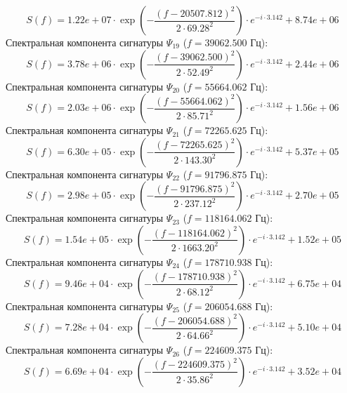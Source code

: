\documentclass[11pt,twocolumn]{article}
\begin{document}
\begin{equation}
S(f) = 1.22e+07 \cdot \exp\left( -\frac{(f - 20507.812)^2}{2 \cdot 69.28^2} \right) \cdot e^{-i \cdot 3.142} + 8.74e+06
\end{equation}
Спектральная компонента сигнатуры $\Psi_{19}$ ($f = 39062.500$ Гц):
\begin{equation}
S(f) = 3.78e+06 \cdot \exp\left( -\frac{(f - 39062.500)^2}{2 \cdot 52.49^2} \right) \cdot e^{-i \cdot 3.142} + 2.44e+06
\end{equation}
Спектральная компонента сигнатуры $\Psi_{20}$ ($f = 55664.062$ Гц):
\begin{equation}
S(f) = 2.03e+06 \cdot \exp\left( -\frac{(f - 55664.062)^2}{2 \cdot 85.71^2} \right) \cdot e^{-i \cdot 3.142} + 1.56e+06
\end{equation}
Спектральная компонента сигнатуры $\Psi_{21}$ ($f = 72265.625$ Гц):
\begin{equation}
S(f) = 6.30e+05 \cdot \exp\left( -\frac{(f - 72265.625)^2}{2 \cdot 143.30^2} \right) \cdot e^{-i \cdot 3.142} + 5.37e+05
\end{equation}
Спектральная компонента сигнатуры $\Psi_{22}$ ($f = 91796.875$ Гц):
\begin{equation}
S(f) = 2.98e+05 \cdot \exp\left( -\frac{(f - 91796.875)^2}{2 \cdot 237.12^2} \right) \cdot e^{-i \cdot 3.142} + 2.70e+05
\end{equation}
Спектральная компонента сигнатуры $\Psi_{23}$ ($f = 118164.062$ Гц):
\begin{equation}
S(f) = 1.54e+05 \cdot \exp\left( -\frac{(f - 118164.062)^2}{2 \cdot 1663.20^2} \right) \cdot e^{-i \cdot 3.142} + 1.52e+05
\end{equation}
Спектральная компонента сигнатуры $\Psi_{24}$ ($f = 178710.938$ Гц):
\begin{equation}
S(f) = 9.46e+04 \cdot \exp\left( -\frac{(f - 178710.938)^2}{2 \cdot 68.12^2} \right) \cdot e^{-i \cdot 3.142} + 6.75e+04
\end{equation}
Спектральная компонента сигнатуры $\Psi_{25}$ ($f = 206054.688$ Гц):
\begin{equation}
S(f) = 7.28e+04 \cdot \exp\left( -\frac{(f - 206054.688)^2}{2 \cdot 64.66^2} \right) \cdot e^{-i \cdot 3.142} + 5.10e+04
\end{equation}
Спектральная компонента сигнатуры $\Psi_{26}$ ($f = 224609.375$ Гц):
\begin{equation}
S(f) = 6.69e+04 \cdot \exp\left( -\frac{(f - 224609.375)^2}{2 \cdot 35.86^2} \right) \cdot e^{-i \cdot 3.142} + 3.52e+04
\end{equation}
\end{document}
